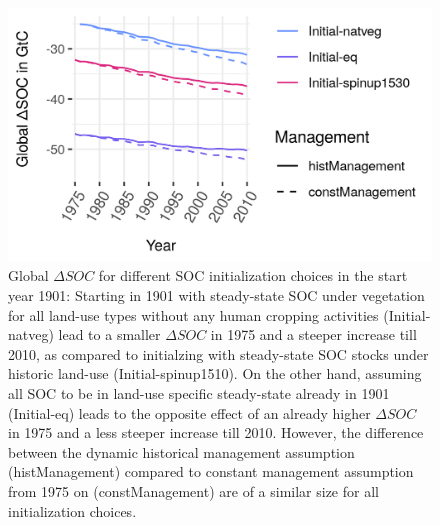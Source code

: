 \documentclass[gc, manuscript]{copernicus}
\begin{document}
\begin{figure}[h]
\includegraphics[width=12cm]{../ResultNotebooks/Output/Images/scenario_init.png} 
\caption{Global $\Delta SOC$ for different SOC initialization choices in the start year 1901: Starting in 1901 with steady-state SOC under vegetation for all land-use types without any human cropping activities (Initial-natveg) lead to a smaller $\Delta SOC$ in 1975 and a steeper increase till 2010, as compared to initialzing with steady-state SOC stocks under historic land-use (Initial-spinup1510). On the other hand, assuming all SOC to be in land-use specific steady-state already in 1901 (Initial-eq) leads to the opposite effect of an already higher $\Delta SOC$ in 1975 and a less steeper increase till 2010. However, the difference between the dynamic historical management assumption (histManagement) compared to constant management assumption from 1975 on (constManagement) are of a similar size for all initialization choices.}
\label{fig:SOCinit}
\end{figure}
\end{document}
